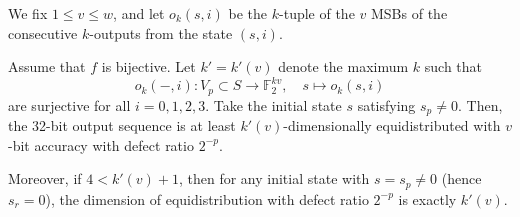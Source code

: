 \documentclass{svmult}
\def\F2{{\mathbb F}_2}
\begin{document}
We fix $1\leq v \leq w$, and let $o_k(s,i)$ be the $k$-tuple
of the $v$ MSBs of the consecutive $k$-outputs from 
the state $(s,i)$.
\begin{proposition}
Assume that $f$ is bijective.
Let $k'=k'(v)$ denote the maximum $k$ 
such that 
\begin{equation}\label{eq:chi-k-i}
o_k(-,i): V_p \subset S \to \F2^{kv}, \quad s \mapsto o_k(s,i)
\end{equation}
are surjective for all $i=0,1,2,3$. 
Take the initial state $s$ satisfying $s_p \neq 0$.
Then, the 32-bit output sequence is at least $k'(v)$-dimensionally
equidistributed with $v$-bit accuracy with defect ratio
$2^{-p}$.

Moreover, if $4 < k'(v)+1$, then  
for any initial state with $s=s_p \neq 0$
(hence $s_r=0$), the dimension of equidistribution
with defect ratio $2^{-p}$ is exactly $k'(v)$.
\end{proposition}
\end{document}
